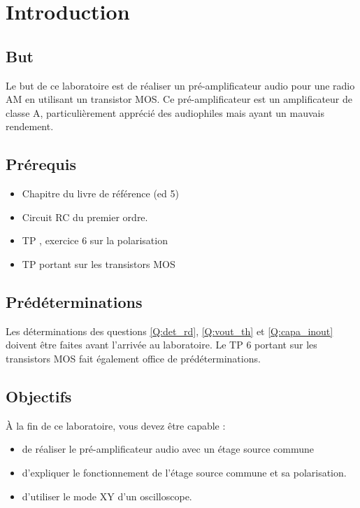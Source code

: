 \documentclass{../template/tp}
\author{The Fantastic Four} %
\begin{document}

\section{Introduction}
\subsection{But}

Le but de ce laboratoire est de réaliser un pré-amplificateur audio pour une radio AM en utilisant un transistor MOS. Ce pré-amplificateur est un amplificateur de classe A, particulièrement apprécié des audiophiles mais ayant un mauvais rendement.

\subsection{Prérequis}
\begin{itemize}
\item Chapitre  du livre de référence (ed 5)
\item Circuit RC du premier ordre.
\item TP , exercice 6 sur la polarisation
\item TP  portant sur les transistors MOS %

\end{itemize}

\subsection{Prédéterminations}

Les déterminations des questions \ref{Q:det_rd}, \ref{Q:vout_th} et \ref{Q:capa_inout} doivent être faites avant l'arrivée au laboratoire. Le TP 6 portant sur les transistors MOS fait également office de prédéterminations.


\subsection{Objectifs}

À la fin de ce laboratoire, vous devez être capable :
\begin{itemize}
\item de réaliser le pré-amplificateur audio avec un étage source commune
\item d'expliquer le fonctionnement de l'étage source commune et sa polarisation.
\item d'utiliser le mode XY d'un oscilloscope.
\end{itemize}
\end{document}
